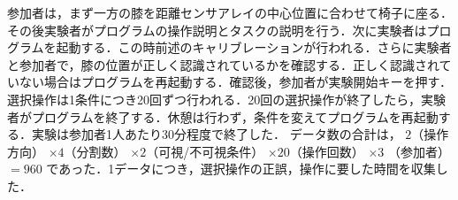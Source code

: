 \documentclass[submit, techrep]{ipsj}
\begin{document}
\par
参加者は，まず一方の膝を距離センサアレイの中心位置に合わせて椅子に座る．その後実験者がプログラムの操作説明とタスクの説明を行う．次に実験者はプログラムを起動する．この時前述のキャリブレーションが行われる．さらに実験者と参加者で，膝の位置が正しく認識されているかを確認する．正しく認識されていない場合はプログラムを再起動する．確認後，参加者が実験開始キーを押す．選択操作は1条件につき20回ずつ行われる．20回の選択操作が終了したら，実験者がプログラムを終了する．休憩は行わず，条件を変えてプログラムを再起動する．実験は参加者1人あたり30分程度で終了した．
データ数の合計は，
$2$（操作方向） $\times 4$（分割数） $\times 2$（可視/不可視条件） $\times 20$（操作回数） $\times 3$ （参加者） $= 960$
であった．1データにつき，選択操作の正誤，操作に要した時間を収集した．

\end{document}
